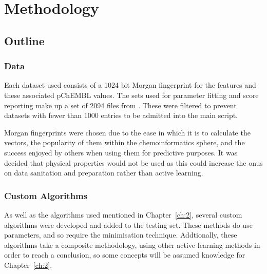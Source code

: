 \chapter{Methodology}

\graphicspath{{Chapter3/Figs/Vector/}{Chapter3/Figs/}}
\section{Outline}
\subsection{Data}
Each dataset used consists of a 1024 bit Morgan fingerprint for the features and these associated pChEMBL values. The sets used for parameter fitting and score reporting make up a set of 2094 files from \textcite{CHEMBL}. These were filtered to prevent datasets with fewer than 1000 entries to be admitted into the main script.

Morgan fingerprints were chosen due to the ease in which it is to calculate the vectors, the popularity of them within the chemoinformatics sphere, and the success enjoyed by others when using them for predictive purposes. It was decided that physical properties would not be used as this could increase the onus on data sanitation and preparation rather than active learning.

\subsection{Custom Algorithms}
As well as the algorithms used mentioned in Chapter~\ref{ch:2}, several custom algorithms were developed and added to the testing set. These methods do use parameters, and so require the minimisation technique. Addtionally, these algorithms take a composite methodology, using other active learning methods in order to reach a conclusion, so some concepts will be assumed knowledge for Chapter~\ref{ch:2}.

